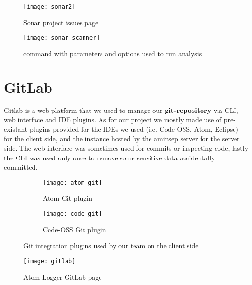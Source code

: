 \documentclass[a4paper,10pt]{report}
\begin{document}
\begin{figure}[H]
	\centering
    \texttt{[image: sonar2]}
    \caption{Sonar project issues page}
    \label{fig:sonar2}
\end{figure}

\begin{figure}[H]
	\centering
    \texttt{[image: sonar-scanner]}
    \caption{command with parameters and options used to run analysis}
    \label{fig:sonar-scanner}
\end{figure}
\section[GitLab] {GitLab} 
Gitlab is a web platform that we used to manage our \textbf{git-repository} via CLI, web interface and IDE plugins.
As for our project we mostly made use of pre-existant plugins provided for the IDEs we used (i.e. Code-OSS, Atom, Eclipse) for the client side, and the instance hosted by the aminsep server for the server side. The web interface was sometimes used for commits or inspecting code, lastly the CLI was used only once to remove some sensitive data accidentally committed.
\begin{figure} [ht]
	\centering
	\begin{subfigure}{0.4\linewidth}
		\centering
    	\texttt{[image: atom-git]}
    	\caption{Atom Git plugin}
	\end{subfigure}
	\hspace{0.5cm}
	\begin{subfigure}{0.4\linewidth}
		\centering
    	\texttt{[image: code-git]}
    	\caption{Code-OSS Git plugin}
	\end{subfigure}
	\caption{Git integration plugins used by our team on the client side}
\end{figure}

\begin{figure}
	\centering
	\texttt{[image: gitlab]}
	\caption{Atom-Logger GitLab page}
\end{figure}
\end{document}
